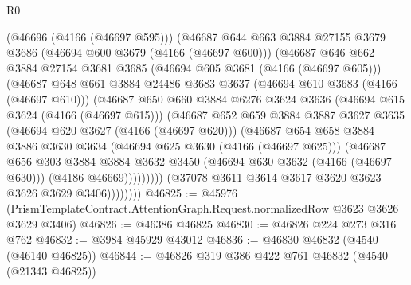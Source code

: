 \begin{lexlean}{R0}
\begin{coremodule}
                    (@46696 (@4166 (@46697 @595)))
                    (@46687
                      @644
                      @663
                      @3884
                      @27155
                      @3679
                      @3686
                      (@46694 @600 @3679 (@4166 (@46697 @600)))
                      (@46687
                        @646
                        @662
                        @3884
                        @27154
                        @3681
                        @3685
                        (@46694 @605 @3681 (@4166 (@46697 @605)))
                        (@46687
                          @648
                          @661
                          @3884
                          @24486
                          @3683
                          @3637
                          (@46694 @610 @3683 (@4166 (@46697 @610)))
                          (@46687
                            @650
                            @660
                            @3884
                            @6276
                            @3624
                            @3636
                            (@46694 @615 @3624 (@4166 (@46697 @615)))
                            (@46687
                              @652
                              @659
                              @3884
                              @3887
                              @3627
                              @3635
                              (@46694 @620 @3627 (@4166 (@46697 @620)))
                              (@46687
                                @654
                                @658
                                @3884
                                @3886
                                @3630
                                @3634
                                (@46694 @625 @3630 (@4166 (@46697 @625)))
                                (@46687
                                  @656
                                  @303
                                  @3884
                                  @3884
                                  @3632
                                  @3450
                                  (@46694 @630 @3632 (@4166 (@46697 @630)))
                                  (@4186 @46669)))))))))
                  (@37078 @3611 @3614 @3617 @3620 @3623 @3626 @3629 @3406))))))))
@46825 := @45976
    (PrismTemplateContract.AttentionGraph.Request.normalizedRow @3623 @3626 @3629 @3406)
@46826 := @46386 @46825
@46830 := @46826 @224 @273 @316 @762
@46832 := @3984 @45929 @43012
@46836 := @46830 @46832 (@4540 (@46140 @46825))
@46844 := @46826 @319 @386 @422 @761 @46832 (@4540 (@21343 @46825))

\end{coremodule}
\end{lexlean}
